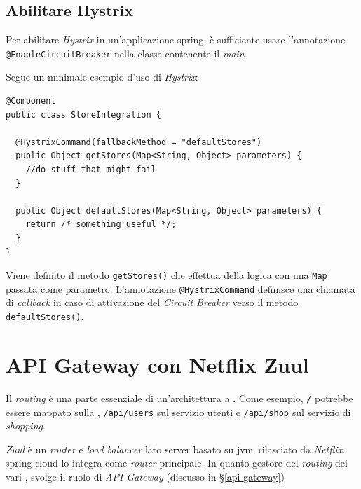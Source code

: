 \subsection{Abilitare Hystrix} Per abilitare \textit{Hystrix} in un'applicazione \gls{spring},
è sufficiente usare l'annotazione \texttt{@EnableCircuitBreaker} nella classe contenente il \textit{main}.

Segue un minimale esempio d'uso di \textit{Hystrix}:

\begin{tcolorbox}
	\begin{lstlisting}
@Component
public class StoreIntegration {

  @HystrixCommand(fallbackMethod = "defaultStores")
  public Object getStores(Map<String, Object> parameters) {
    //do stuff that might fail
  }

  public Object defaultStores(Map<String, Object> parameters) {
    return /* something useful */;
  }
}
	\end{lstlisting}
\end{tcolorbox}

Viene definito il metodo \texttt{getStores()} che effettua della logica con una \texttt{Map} passata come parametro.
L'annotazione \texttt{@HystrixCommand} definisce una chiamata di \textit{callback} in caso di attivazione del \textit{Circuit Breaker} verso il metodo \texttt{defaultStores()}.


\section{API Gateway con Netflix Zuul}

Il \textit{routing} è una parte essenziale di un'architettura a . Come esempio, \texttt{/} potrebbe essere mappato sulla , \texttt{/api/users} sul servizio utenti e \texttt{/api/shop} sul servizio di \textit{shopping}.

\textit{Zuul} è un \textit{router} e \textit{load balancer} lato server basato su \gls{jvm}\gloss\ rilasciato da \textit{Netflix}. \gls{spring-cloud} lo integra come \textit{router} principale. In quanto gestore del \textit{routing} dei vari , svolge il ruolo di \textit{API Gateway} (discusso in \S\ref{api-gateway})


